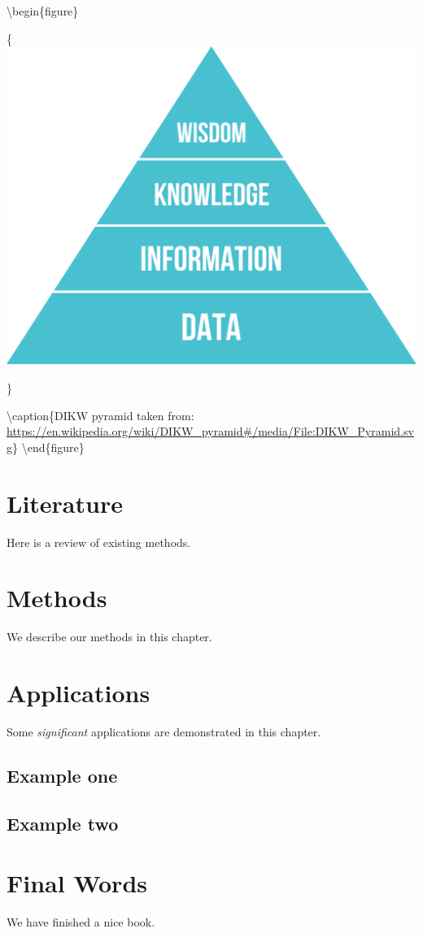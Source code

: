 \documentclass[
]{book}
\begin{document}
\textbackslash begin\{figure\}

\{\centering \includegraphics[width=0.8\linewidth]{images/pyramid}

\}

\textbackslash caption\{DIKW pyramid taken from: \url{https://en.wikipedia.org/wiki/DIKW_pyramid\#/media/File:DIKW_Pyramid.svg}\}\label{fig:dikw-fig}
\textbackslash end\{figure\}

\hypertarget{literature}{%
\chapter{Literature}\label{literature}}

Here is a review of existing methods.

\hypertarget{methods}{%
\chapter{Methods}\label{methods}}

We describe our methods in this chapter.

\hypertarget{applications}{%
\chapter{Applications}\label{applications}}

Some \emph{significant} applications are demonstrated in this chapter.

\hypertarget{example-one}{%
\section{Example one}\label{example-one}}

\hypertarget{example-two}{%
\section{Example two}\label{example-two}}

\hypertarget{final-words}{%
\chapter{Final Words}\label{final-words}}

We have finished a nice book.

  
\end{document}
